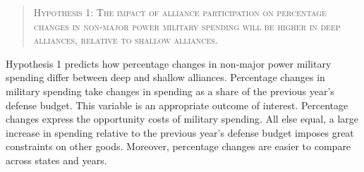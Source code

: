 \documentclass[12pt]{article}
\begin{document}
\begin{quote}
\textsc{Hypothesis 1: The impact of alliance participation on percentage changes in non-major power military spending will be higher in deep alliances, relative to shallow alliances.}
\end{quote}


Hypothesis 1 predicts how percentage changes in non-major power military spending differ between deep and shallow alliances. 
Percentage changes in military spending take changes in spending as a share of the previous year's defense budget.
This variable is an appropriate outcome of interest. 
Percentage changes express the opportunity costs of military spending. 
All else equal, a large increase in spending relative to the previous year's defense budget imposes great constraints on other goods. 
Moreover, percentage changes are easier to compare across states and years. 
\end{document}
